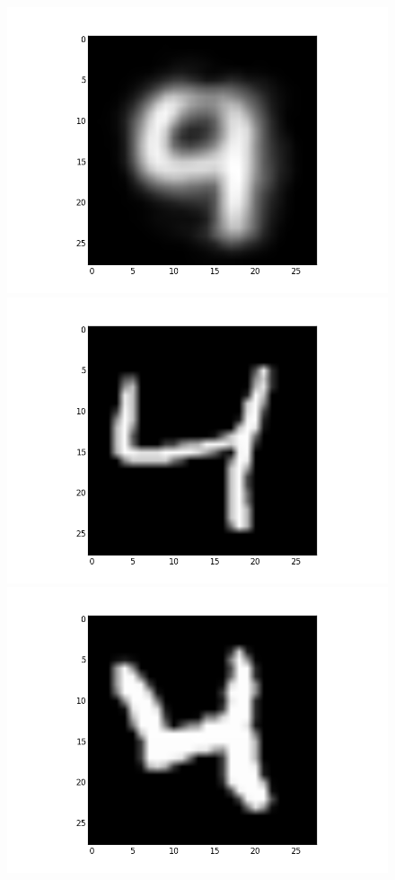 \documentclass[submit]{harvardml}
\begin{document}
\begin{figure}[ht]
    \centering
    \includegraphics[scale=0.20]{K10-mean-7}
    \includegraphics[scale=0.20]{K10-representative-7-0}
    \includegraphics[scale=0.20]{K10-representative-7-1}

\end{figure}
\end{document}

